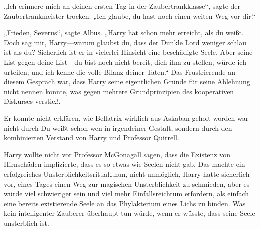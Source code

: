 „Ich erinnere mich an deinen ersten Tag in der Zaubertrankklasse“, sagte der Zaubertrankmeister trocken. „Ich glaube, du hast noch einen weiten Weg vor dir.“

„Frieden, Severus“, sagte Albus. „Harry hat schon mehr erreicht, als du weißt. Doch sag mir, Harry—warum glaubst du, dass der Dunkle Lord weniger schlau ist als du? Sicherlich ist er in vielerlei Hinsicht eine beschädigte Seele. Aber seine List gegen deine List—du bist noch nicht bereit, dich ihm zu stellen, würde ich urteilen; und ich kenne die volle Bilanz deiner Taten.“ \later Das Frustrierende an diesem Gespräch war, dass Harry seine eigentlichen Gründe für seine Ablehnung nicht nennen konnte, was gegen mehrere Grundprinzipien des kooperativen Diskurses verstieß.

Er konnte nicht erklären, wie Bellatrix wirklich aus Askaban geholt worden war—nicht durch Du-weißt-schon-wen in irgendeiner Gestalt, sondern durch den kombinierten Verstand von Harry und Professor Quirrell.

Harry wollte nicht vor Professor McGonagall sagen, dass die Existenz von Hirnschäden implizierte, dass es so etwas wie Seelen nicht gab. Das machte ein erfolgreiches Unsterblichkeitsritual…nun, nicht unmöglich, Harry hatte sicherlich vor, eines Tages einen Weg zur magischen Unsterblichkeit zu schmieden, aber es würde viel schwieriger sein und viel mehr Einfallsreichtum erfordern, als einfach eine bereits existierende Seele an das Phylakterium eines Lichs zu binden. Was kein intelligenter Zauberer überhaupt tun würde, wenn er wüsste, dass seine Seele unsterblich ist.

